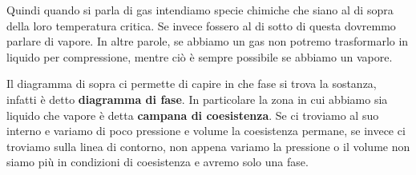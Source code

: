 \vspace{0.2cm}Quindi quando si parla di gas intendiamo specie chimiche che siano al di sopra della loro temperatura critica. Se invece fossero al di sotto di questa dovremmo parlare di vapore. In altre parole, se abbiamo un gas non potremo trasformarlo in liquido per compressione, mentre ciò è sempre possibile se abbiamo un vapore.

\vspace{0.2cm} Il diagramma di sopra ci permette di capire in che fase si trova la sostanza, infatti è detto \textbf{diagramma di fase}. In particolare la zona in cui abbiamo sia liquido che vapore è detta \textbf{campana di coesistenza}. Se ci troviamo al suo interno e variamo di poco pressione e volume la coesistenza permane, se invece ci troviamo sulla linea di contorno, non appena variamo la pressione o il volume non siamo più in condizioni di coesistenza e avremo solo una fase.